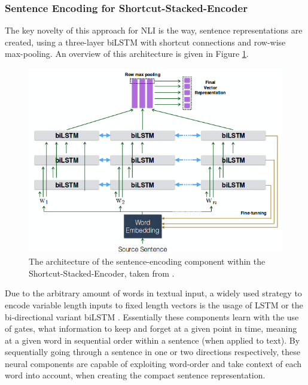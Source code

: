 \subsubsection{Sentence Encoding for Shortcut-Stacked-Encoder}
The key novelty of this approach for \ac{NLI} is the way, sentence representations are created, using a three-layer \ac{biLSTM} with shortcut connections and row-wise max-pooling. An overview of this architecture is given in Figure \ref{fig:sentence_emcoder_shortcut}.
\begin{figure}[tph!]
\centering
	\includegraphics[totalheight=8cm]{fig/sentence_encoder_shortcut.png}
	\caption{The architecture of the sentence-encoding component within the Shortcut-Stacked-Encoder, taken from \cite{nie2017shortcut}.}
	\label{fig:sentence_emcoder_shortcut}
\end{figure}
Due to the arbitrary amount of words in textual input, a widely used strategy to encode variable length inputs to fixed length vectors is the usage of \ac{LSTM} \citep{hochreiter1997long} or the bi-directional variant \ac{biLSTM} \citep{graves2005framewise}. Essentially these components learn with the use of gates, what information to keep and forget at a given point in time, meaning at a given word in sequential order within a sentence (when applied to text). By sequentially going through a sentence in one or two directions respectively, these neural components are capable of exploiting word-order and take context of each word into account, when creating the compact sentence representation.
\newline


